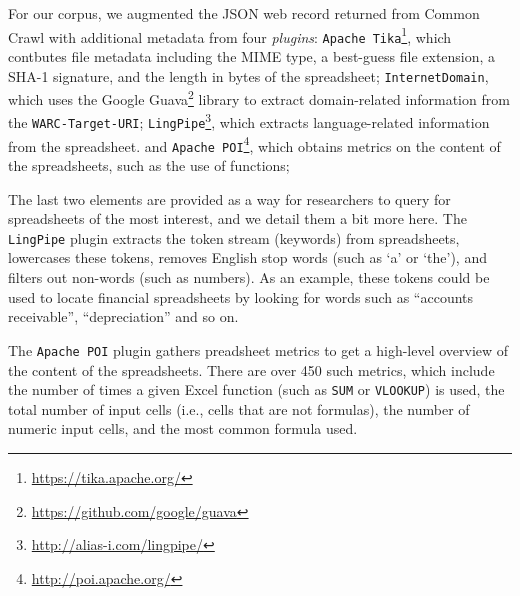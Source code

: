 \documentclass[conference]{IEEEtran}
\begin{document}

For our corpus, we augmented the JSON web record returned from Common Crawl with additional metadata from four \textit{plugins}: 
\texttt{Apache Tika}\footnote{\url{https://tika.apache.org/}}, which contbutes file metadata including the MIME type, a best-guess file extension, a SHA-1 signature, and the length in bytes of the spreadsheet;
\texttt{InternetDomain}, which uses the Google Guava\footnote{\url{https://github.com/google/guava}} library to extract domain-related information from the \texttt{WARC-Target-URI};
\texttt{LingPipe}\footnote{\url{http://alias-i.com/lingpipe/}}, which extracts language-related information from the spreadsheet. 
and \texttt{Apache POI}\footnote{\url{http://poi.apache.org/}}, which obtains metrics on the content of the spreadsheets, such as the use of functions;

The last two elements are provided as a way for researchers to query for spreadsheets of the most interest, and we detail them a bit more here.
The \texttt{LingPipe} plugin extracts the token stream (keywords) from spreadsheets, lowercases these tokens, removes English stop words (such as `a' or `the'), and filters out non-words (such as numbers).
As an example, these tokens could be used to locate financial spreadsheets by looking for words such as ``accounts receivable'', ``depreciation'' and so on.

The \texttt{Apache POI} plugin gathers preadsheet metrics to get a high-level overview of the content of the spreadsheets.
There are over 450 such metrics, which include the number of times a given Excel function (such as \texttt{SUM} or \texttt{VLOOKUP}) is used, the total number of input cells (i.e., cells that are not formulas), the number of numeric input cells, and the most common formula used. 
\end{document}
